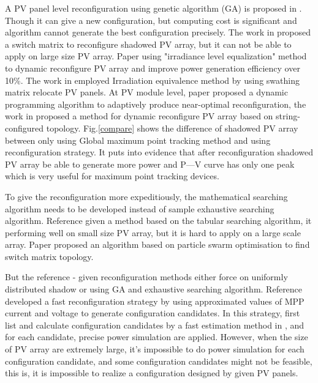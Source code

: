 \documentclass[conference]{IEEEtran}
\begin{document}
A PV panel level reconfiguration using genetic algorithm (GA) is proposed in \cite{carotenuto2015evolutionary}. Though it can give a new configuration, but computing cost is significant and algorithm cannot generate the best configuration precisely. The work in \cite{nguyen2008adaptive} proposed a switch matrix to reconfigure shadowed PV array, but it can not be able to apply on large size PV array. Paper \cite{storey2013improved} using "irradiance level equalization" method to dynamic reconfigure PV array and improve power generation efficiency over 10\%. The work in \cite{malathy2017reconfiguration} employed Irradiation equivalence method by using swathing matrix relocate PV panels. At PV module level, paper \cite{wang2014architecture} proposed a dynamic programming algorithm to adaptively produce near-optimal reconfiguration, the work in \cite{storey2014optimized} proposed a method for dynamic reconfigure PV array based on string-configured topology.
Fig.\ref{compare} shows the difference of shadowed PV array between only using Global maximum point tracking method and using reconfiguration strategy.
It puts into evidence that after reconfiguration shadowed PV array be able to generate more power and P—V curve has only one peak which is very useful for maximum point tracking devices.

To give the reconfiguration more expeditiously, the mathematical searching algorithm needs to be developed instead of sample exhaustive searching algorithm. Reference \cite{faldella1991architectural} given a method based on the tabular searching algorithm, it performing well on small size PV array, but it is hard to apply on a large scale array. Paper \cite{iraji2017optimisation} proposed an algorithm based on particle swarm optimisation to find switch matrix topology. 

But the reference \cite{carotenuto2015evolutionary} -\cite{iraji2017optimisation} given reconfiguration methods either force on uniformly distributed shadow or using GA and exhaustive searching algorithm. Reference \cite{orozco2016optimized} developed a fast reconfiguration strategy by using approximated values of MPP current and voltage to generate configuration candidates. In this strategy, first list and calculate configuration candidates by a fast estimation method in \cite{orozco2015fast}, and for each candidate, precise power simulation are applied. However, when the size of PV array are extremely large, it's impossible to do power simulation for each configuration candidate, and some configuration candidates might not be feasible, this is, it is impossible to realize a configuration designed by given PV panels.
\end{document}
